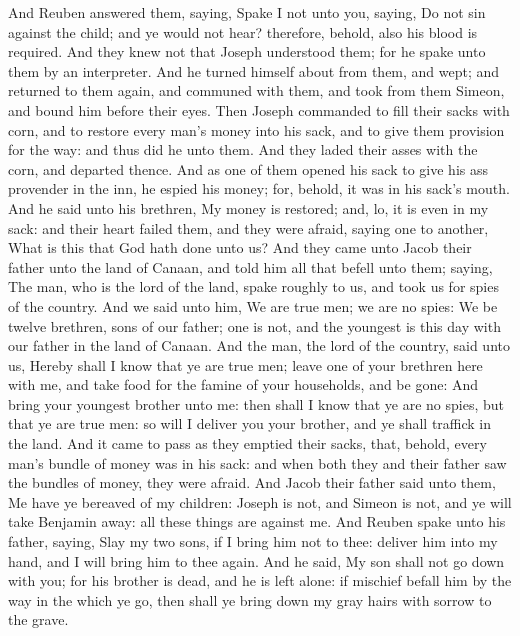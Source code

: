 \begin{biblechapter}
\verse And Reuben answered them, saying, Spake I not unto you, saying, Do not sin against the child; and ye would not hear? therefore, behold, also his blood is required.
\verse And they knew not that Joseph understood them; for he spake unto them by an interpreter.
\verse And he turned himself about from them, and wept; and returned to them again, and communed with them, and took from them Simeon, and bound him before their eyes.
\verse Then Joseph commanded to fill their sacks with corn, and to restore every man's money into his sack, and to give them provision for the way: and thus did he unto them.
\verse And they laded their asses with the corn, and departed thence.
\verse And as one of them opened his sack to give his ass provender in the inn, he espied his money; for, behold, it was in his sack's mouth.
\verse And he said unto his brethren, My money is restored; and, lo, it is even in my sack: and their heart failed them, and they were afraid, saying one to another, What is this that God hath done unto us?
\verse And they came unto Jacob their father unto the land of Canaan, and told him all that befell unto them; saying,
\verse The man, who is the lord of the land, spake roughly to us, and took us for spies of the country.
\verse And we said unto him, We are true men; we are no spies:
\verse We be twelve brethren, sons of our father; one is not, and the youngest is this day with our father in the land of Canaan.
\verse And the man, the lord of the country, said unto us, Hereby shall I know that ye are true men; leave one of your brethren here with me, and take food for the famine of your households, and be gone:
\verse And bring your youngest brother unto me: then shall I know that ye are no spies, but that ye are true men: so will I deliver you your brother, and ye shall traffick in the land.
\verse And it came to pass as they emptied their sacks, that, behold, every man's bundle of money was in his sack: and when both they and their father saw the bundles of money, they were afraid.
\verse And Jacob their father said unto them, Me have ye bereaved of my children: Joseph is not, and Simeon is not, and ye will take Benjamin away: all these things are against me.
\verse And Reuben spake unto his father, saying, Slay my two sons, if I bring him not to thee: deliver him into my hand, and I will bring him to thee again.
\verse And he said, My son shall not go down with you; for his brother is dead, and he is left alone: if mischief befall him by the way in the which ye go, then shall ye bring down my gray hairs with sorrow to the grave.
\end{biblechapter}

